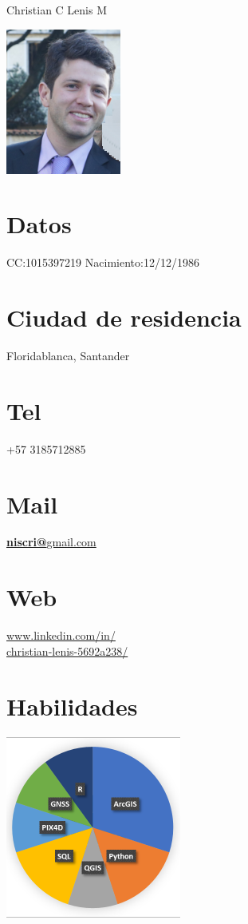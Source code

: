 \documentclass[]{friggeri-cv}
\begin{document}
\header 
{\hspace{2\baselineskip} Christian C} { Lenis M}
  

\begin{aside}
\includegraphics[scale=0.2]{img/Photo.png}
  \section{Datos}
    CC:1015397219
    Nacimiento:12/12/1986
    ~
  \section{Ciudad de residencia}
    Floridablanca,
    Santander
    ~
  \section{Tel }
    +57 3185712885  
    ~
  \section{Mail}
    \href{mailto:niscri@gmail.com}{\textbf{niscri@}gmail.com}
    ~
  \section{Web}
    \href{url}{{www.linkedin.com/in/}\\{christian-lenis-5692a238/}}
    ~
  \section{Habilidades}
    \includegraphics[scale=0.62]{img/programming.png}
   ~

\end{aside}
\end{document}
